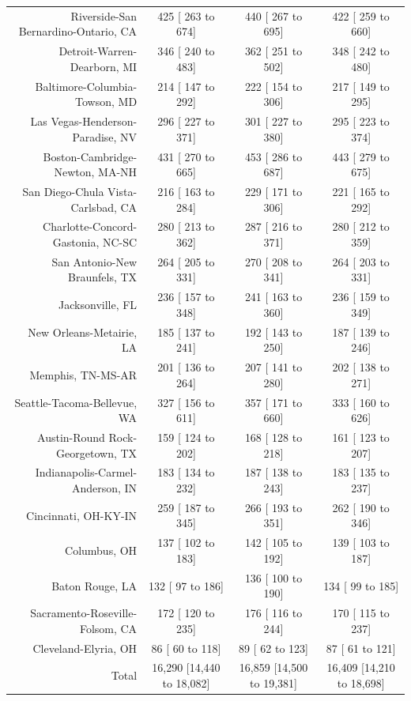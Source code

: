 \documentclass{article}
\begin{document}
\begin{table}[H]
\begin{tabular}{|r|c|c|c|}
		Riverside-San Bernardino-Ontario, CA &    425 [   263 to    674] &    440 [   267 to    695] &    422 [   259 to    660]\\
		Detroit-Warren-Dearborn, MI &    346 [   240 to    483] &    362 [   251 to    502] &    348 [   242 to    480]\\
		Baltimore-Columbia-Towson, MD &    214 [   147 to    292] &    222 [   154 to    306] &    217 [   149 to    295]\\
		Las Vegas-Henderson-Paradise, NV &    296 [   227 to    371] &    301 [   227 to    380] &    295 [   223 to    374]\\
		Boston-Cambridge-Newton, MA-NH &    431 [   270 to    665] &    453 [   286 to    687] &    443 [   279 to    675]\\
		San Diego-Chula Vista-Carlsbad, CA &    216 [   163 to    284] &    229 [   171 to    306] &    221 [   165 to    292]\\
		Charlotte-Concord-Gastonia, NC-SC &    280 [   213 to    362] &    287 [   216 to    371] &    280 [   212 to    359]\\
		San Antonio-New Braunfels, TX &    264 [   205 to    331] &    270 [   208 to    341] &    264 [   203 to    331]\\
		Jacksonville, FL &    236 [   157 to    348] &    241 [   163 to    360] &    236 [   159 to    349]\\
		New Orleans-Metairie, LA &    185 [   137 to    241] &    192 [   143 to    250] &    187 [   139 to    246]\\
		Memphis, TN-MS-AR &    201 [   136 to    264] &    207 [   141 to    280] &    202 [   138 to    271]\\
		Seattle-Tacoma-Bellevue, WA &    327 [   156 to    611] &    357 [   171 to    660] &    333 [   160 to    626]\\
		Austin-Round Rock-Georgetown, TX &    159 [   124 to    202] &    168 [   128 to    218] &    161 [   123 to    207]\\
		Indianapolis-Carmel-Anderson, IN &    183 [   134 to    232] &    187 [   138 to    243] &    183 [   135 to    237]\\
		Cincinnati, OH-KY-IN &    259 [   187 to    345] &    266 [   193 to    351] &    262 [   190 to    346]\\
		Columbus, OH &    137 [   102 to    183] &    142 [   105 to    192] &    139 [   103 to    187]\\
		Baton Rouge, LA &    132 [    97 to    186] &    136 [   100 to    190] &    134 [    99 to    185]\\
		Sacramento-Roseville-Folsom, CA &    172 [   120 to    235] &    176 [   116 to    244] &    170 [   115 to    237]\\
		Cleveland-Elyria, OH &     86 [    60 to    118] &     89 [    62 to    123] &     87 [    61 to    121]\\
		\hline
		Total & 16,290 [14,440 to 18,082] & 16,859 [14,500 to 19,381] & 16,409 [14,210 to 18,698]\\
		\hline
	\end{tabular}
\end{table}
\end{document}
